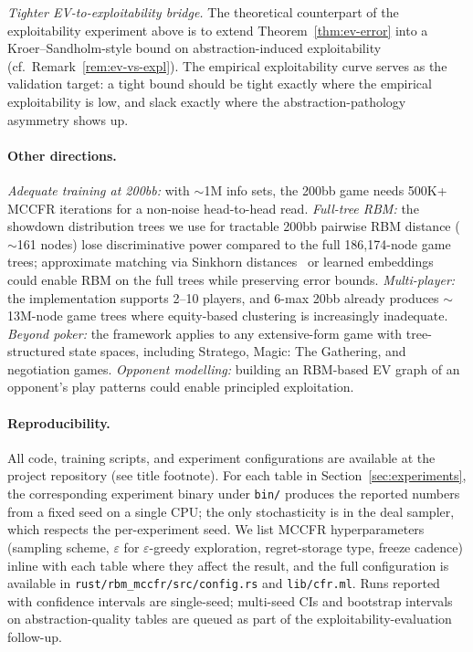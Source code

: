 \documentclass[11pt]{article}
\begin{document}
\emph{Tighter EV-to-exploitability bridge.} The theoretical
counterpart of the exploitability experiment above is to extend
Theorem~\ref{thm:ev-error} into a Kroer--Sandholm-style bound on
abstraction-induced exploitability (cf.\
Remark~\ref{rem:ev-vs-expl}). The empirical exploitability curve
serves as the validation target: a tight bound should be tight
exactly where the empirical exploitability is low, and slack exactly
where the abstraction-pathology asymmetry shows up.

\paragraph{Other directions.}
\emph{Adequate training at 200bb:} with ${\sim}$1M info sets, the
200bb game needs 500K+ MCCFR iterations for a non-noise head-to-head
read.
\emph{Full-tree RBM:} the showdown distribution trees we use for
tractable 200bb pairwise RBM distance (${\sim}$161 nodes) lose
discriminative power compared to the full 186{,}174-node game trees;
approximate matching via Sinkhorn
distances~\citep{cuturi2013sinkhorn} or learned embeddings could
enable RBM on the full trees while preserving error bounds.
\emph{Multi-player:} the implementation supports 2--10 players, and
6-max 20bb already produces ${\sim}$13M-node game trees where
equity-based clustering is increasingly inadequate.
\emph{Beyond poker:} the framework applies to any extensive-form game
with tree-structured state spaces, including Stratego, Magic: The
Gathering, and negotiation games.
\emph{Opponent modelling:} building an RBM-based EV graph of an
opponent's play patterns could enable principled exploitation.

\paragraph{Reproducibility.} All code, training scripts, and
experiment configurations are available at the project repository
(see title footnote). For each table in
Section~\ref{sec:experiments}, the corresponding experiment binary
under \texttt{bin/} produces the reported numbers from a fixed seed
on a single CPU; the only stochasticity is in the deal sampler,
which respects the per-experiment seed. We list MCCFR
hyperparameters (sampling scheme, $\varepsilon$ for
$\varepsilon$-greedy exploration, regret-storage type, freeze cadence)
inline with each table where they affect the result, and the full
configuration is available in \texttt{rust/rbm\_mccfr/src/config.rs}
and \texttt{lib/cfr.ml}. Runs reported with confidence intervals are
single-seed; multi-seed CIs and bootstrap intervals on
abstraction-quality tables are queued as part of the
exploitability-evaluation follow-up.
\end{document}
